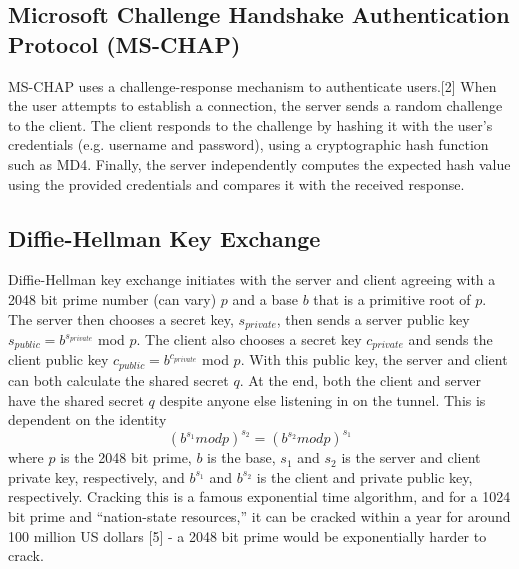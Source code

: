 \documentclass[runningheads]{llncs}
\begin{document}
\subsection{Microsoft Challenge Handshake Authentication Protocol (MS-CHAP)}
MS-CHAP uses a challenge-response mechanism to authenticate users.[2] When the user attempts to establish a connection, the server sends a random challenge to the client. The client responds to the challenge by hashing it with the user’s credentials (e.g. username and password), using a cryptographic hash function such as MD4. Finally, the server independently computes the expected hash value using the provided credentials and compares it with the received response.
\subsection{Diffie-Hellman Key Exchange}
Diffie-Hellman key exchange initiates with the server and client agreeing with a 2048 bit prime number (can vary) $p$ and a base $b$ that is a primitive root of $p$. The server then chooses a secret key, $s_{private}$, then sends a server public key $s_{public} = b^{s_{private}}$ mod $p$. The client also chooses a secret key $c_{private}$ and sends the client public key $c_{public} = b^{c_{private}}$ mod $p$. With this public key, the server and client can both calculate the shared secret $q$. At the end, both the client and server have the shared secret $q$ despite anyone else listening in on the tunnel. This is dependent on the identity
\begin{equation}
(b^{s_1} mod p)^{s_2} = (b^{s_2} mod p)^{s_1}
\end{equation}
where $p$ is the 2048 bit prime, $b$ is the base, $s_1$ and $s_2$ is the server and client private key,  respectively, and $b^{s_1}$ and $b^{s_2}$ is the client and private public key, respectively. Cracking this is a famous exponential time algorithm, and for a 1024 bit prime and “nation-state resources,” it can be cracked within a year for around 100 million US dollars [5] - a 2048 bit prime would be exponentially harder to crack.
\end{document}
